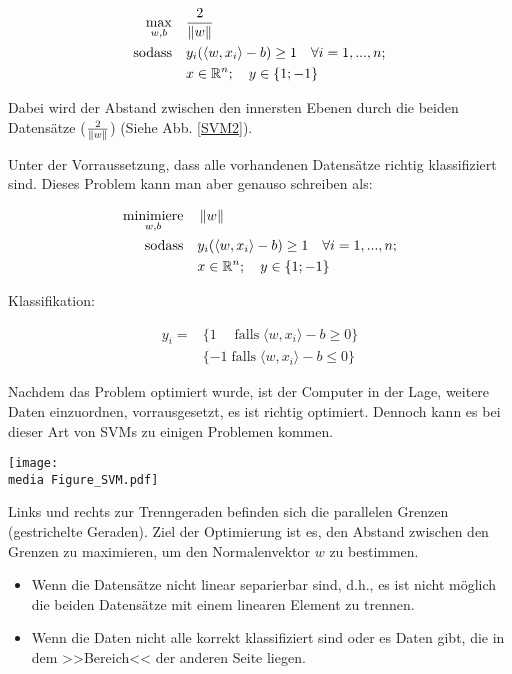 \begin{align*}
	\underset{w,b}{\operatorname{max}} \quad & \frac{2}{\left\lVert w\right\rVert} \\
	\operatorname{sodass} \quad &y_{i}(\langle w,x_{i} \rangle -b) \geq 1 \quad \forall  i = 1,...,n ; \\
	&x \in \mathbb{R}^n; \quad	y \in \{1;-1\}
\end{align*}

Dabei wird der Abstand zwischen den innersten Ebenen durch die beiden Datensätze ($\frac{2}{\left\lVert w\right\rVert}$) (Siehe Abb. \ref{SVM2}).

Unter der Vorraussetzung, dass alle vorhandenen Datensätze richtig klassifiziert sind. Dieses Problem kann 
man aber genauso schreiben als:

\begin{align*}
		\underset{w,b}{\operatorname{minimiere}} \quad & \left\lVert w\right\rVert \\
		\operatorname{sodass} \quad &y_{i}(\langle w,x_{i} \rangle -b) \geq 1 \quad \forall i = 1,...,n ; \\
		&x \in \mathbb{R}^n; \quad y \in \{1; -1\}
\end{align*}

Klassifikation:

\begin{align*}
	y_{i} =& \{ 1 \quad \operatorname{falls} \langle w,x_{i} \rangle - b \geq 0\} \\
		& \{ -1 \operatorname{falls} \langle w,x_{i} \rangle - b \leq 0\}
\end{align*}

Nachdem das Problem optimiert wurde, ist der Computer in der Lage, weitere Daten einzuordnen, vorrausgesetzt, es ist richtig optimiert.
Dennoch kann es bei dieser Art von SVMs zu einigen Problemen kommen.\\

\begin{dsafigure}
	\begin{center}
		\texttt{[image: \\media Figure\_SVM.pdf]}
		\caption{Links und rechts zur Trenngeraden befinden sich die parallelen Grenzen (gestrichelte Geraden). Ziel der Optimierung ist es, den Abstand zwischen den Grenzen zu maximieren, um den Normalenvektor $w$ zu bestimmen.}
		\label{SVM2}
	\end{center}
\end{dsafigure}

\begin{itemize}
	\item Wenn die Datensätze nicht linear separierbar sind, d.h., es ist nicht möglich die beiden Datensätze mit einem linearen Element zu trennen.
	
	\item Wenn die Daten nicht alle korrekt klassifiziert sind oder es Daten gibt, die in dem >>Bereich<< der anderen Seite liegen.
\end{itemize}

